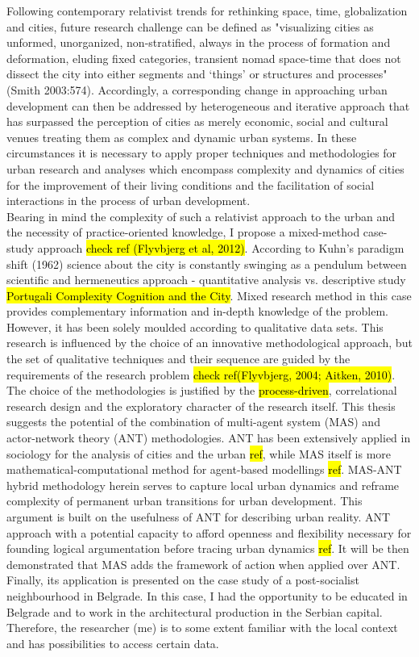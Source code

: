 \documentclass[11pt]{report}
\begin{document}
Following contemporary relativist trends for rethinking space, time, globalization and cities, future research challenge can be defined as "visualizing cities as unformed, unorganized, non-stratified, always in the process of formation and deformation, eluding fixed categories, transient nomad space-time that does not dissect the city into either segments and ‘things’ or structures and processes" (Smith 2003:574). Accordingly, a corresponding change in approaching urban development can then be addressed by heterogeneous and iterative approach that has surpassed the perception of cities as merely economic, social and cultural venues treating them as complex and dynamic urban systems. In these circumstances it is necessary to apply proper techniques and methodologies for urban research and analyses which encompass complexity and dynamics of cities for the improvement of their living conditions and the facilitation of social interactions in the process of urban development. 
\\
Bearing in mind the complexity of such a relativist approach to the urban and the necessity of practice-oriented knowledge, I propose a mixed-method case-study approach \hl{check ref (Flyvbjerg et al, 2012)}. According to Kuhn's paradigm shift (1962) science about the city is constantly swinging as a pendulum between scientific and hermeneutics approach - quantitative analysis vs. descriptive study \hl{Portugali Complexity Cognition and the City}. Mixed research method in this case provides complementary information and in-depth knowledge of the problem. However, it has been solely moulded according to qualitative data sets. This research is influenced by the choice of an innovative methodological approach,  but  the  set of qualitative techniques  and  their  sequence  are  guided by the requirements of the research problem \hl{check ref(Flyvbjerg, 2004; Aitken, 2010)}.
\\
The choice of the methodologies is justified by the \hl{process-driven}, correlational research design and the exploratory character of the research itself. This thesis suggests the potential of the combination of multi-agent system (MAS) and actor-network theory (ANT) methodologies. ANT has been extensively applied in sociology for the analysis of cities and the urban \hl{ref}, while MAS itself is more mathematical-computational method for agent-based modellings \hl{ref}. MAS-ANT hybrid methodology  herein serves to capture local urban dynamics and reframe complexity of permanent urban transitions for urban development. This argument is built on the usefulness of ANT for describing urban reality. ANT approach with a potential capacity to afford openness and flexibility necessary for founding logical argumentation before tracing urban dynamics \hl{ref}. It will be then demonstrated that MAS adds the framework of action when applied over ANT. Finally, its application is presented on the case study of a post-socialist neighbourhood in Belgrade. In this case, I had the opportunity to be educated in Belgrade and to work in the architectural production in the Serbian capital. Therefore, the  researcher (me) is  to  some  extent  familiar  with  the  local  context  and has possibilities to access certain data.
\end{document}
